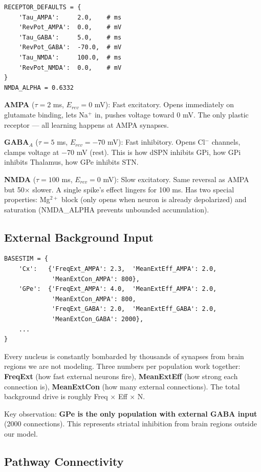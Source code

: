 \documentclass[11pt,a4paper]{article}
\begin{document}
\begin{lstlisting}
RECEPTOR_DEFAULTS = {
    'Tau_AMPA':     2.0,    # ms
    'RevPot_AMPA':  0.0,    # mV
    'Tau_GABA':     5.0,    # ms
    'RevPot_GABA':  -70.0,  # mV
    'Tau_NMDA':     100.0,  # ms
    'RevPot_NMDA':  0.0,    # mV
}
NMDA_ALPHA = 0.6332
\end{lstlisting}

\textbf{AMPA} ($\tau = 2$ ms, $E_{rev} = 0$ mV): Fast excitatory. Opens immediately on glutamate binding, lets Na$^+$ in, pushes voltage toward 0 mV. The only plastic receptor --- all learning happens at AMPA synapses.

\textbf{GABA$_A$} ($\tau = 5$ ms, $E_{rev} = -70$ mV): Fast inhibitory. Opens Cl$^-$ channels, clamps voltage at $-$70 mV (rest). This is how dSPN inhibits GPi, how GPi inhibits Thalamus, how GPe inhibits STN.

\textbf{NMDA} ($\tau = 100$ ms, $E_{rev} = 0$ mV): Slow excitatory. Same reversal as AMPA but 50$\times$ slower. A single spike's effect lingers for 100 ms. Has two special properties: Mg$^{2+}$ block (only opens when neuron is already depolarized) and saturation (NMDA\_ALPHA prevents unbounded accumulation).

\subsection{External Background Input}

\begin{lstlisting}
BASESTIM = {
    'Cx':   {'FreqExt_AMPA': 2.3,  'MeanExtEff_AMPA': 2.0,
             'MeanExtCon_AMPA': 800},
    'GPe':  {'FreqExt_AMPA': 4.0,  'MeanExtEff_AMPA': 2.0,
             'MeanExtCon_AMPA': 800,
             'FreqExt_GABA': 2.0,  'MeanExtEff_GABA': 2.0,
             'MeanExtCon_GABA': 2000},
    ...
}
\end{lstlisting}

Every nucleus is constantly bombarded by thousands of synapses from brain regions we are not modeling. Three numbers per population work together: \textbf{FreqExt} (how fast external neurons fire), \textbf{MeanExtEff} (how strong each connection is), \textbf{MeanExtCon} (how many external connections). The total background drive is roughly Freq $\times$ Eff $\times$ N.

Key observation: \textbf{GPe is the only population with external GABA input} (2000 connections). This represents striatal inhibition from brain regions outside our model.

\subsection{Pathway Connectivity}
\end{document}

